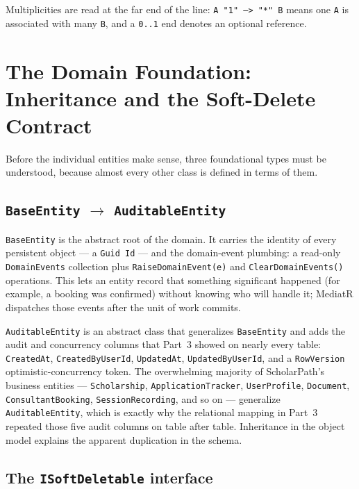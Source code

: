 \documentclass[11pt,a4paper]{article}
\begin{document}
Multiplicities are read at the far end of the line: \texttt{A "1" --> "*" B}
means one \texttt{A} is associated with many \texttt{B}, and a \texttt{0..1}
end denotes an optional reference.

\section{The Domain Foundation: Inheritance and the Soft-Delete Contract}

Before the individual entities make sense, three foundational types must be
understood, because almost every other class is defined in terms of them.

\subsection{\texttt{BaseEntity} $\rightarrow$ \texttt{AuditableEntity}}

\texttt{BaseEntity} is the abstract root of the domain. It carries the identity
of every persistent object --- a \texttt{Guid Id} --- and the domain-event
plumbing: a read-only \texttt{DomainEvents} collection plus
\texttt{RaiseDomainEvent(e)} and \texttt{ClearDomainEvents()} operations. This
lets an entity record that something significant happened (for example, a
booking was confirmed) without knowing who will handle it; MediatR dispatches
those events after the unit of work commits.

\texttt{AuditableEntity} is an abstract class that generalizes
\texttt{BaseEntity} and adds the audit and concurrency columns that Part~3
showed on nearly every table: \texttt{CreatedAt}, \texttt{CreatedByUserId},
\texttt{UpdatedAt}, \texttt{UpdatedByUserId}, and a \texttt{RowVersion}
optimistic-concurrency token. The overwhelming majority of ScholarPath's
business entities --- \texttt{Scholarship}, \texttt{ApplicationTracker},
\texttt{UserProfile}, \texttt{Document}, \texttt{ConsultantBooking},
\texttt{SessionRecording}, and so on --- generalize \texttt{AuditableEntity},
which is exactly why the relational mapping in Part~3 repeated those five audit
columns on table after table. Inheritance in the object model explains the
apparent duplication in the schema.

\subsection{The \texttt{ISoftDeletable} interface}
\end{document}
